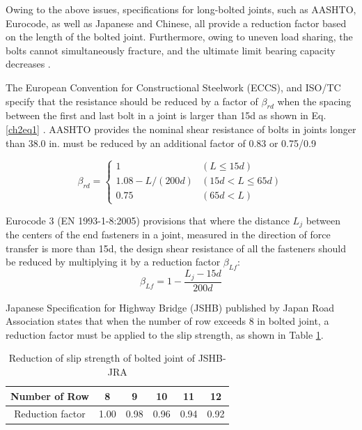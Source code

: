 Owing to the above issues, specifications for long-bolted joints, such as AASHTO, Eurocode, as well as Japanese and Chinese, all provide a reduction factor based on the length of the bolted joint\cite{AASHTO2020,eccs1985,isohtb,eurocode3-21,douji2017}. Furthermore, owing to uneven load sharing, the bolts cannot simultaneously fracture, and the ultimate limit bearing capacity decreases \cite{Takai2021BoltUnbuttoning,Peng2013FeaDimensions,peng2010,longstainless2022}. 

The European Convention for Constructional Steelwork (ECCS), and ISO/TC specify that the resistance should be reduced by a factor of $\beta_{rd}$ when the spacing between the first and last bolt in a joint is larger than 15d as shown in Eq.\ref{ch2eq1} \cite{eccs1985,isohtb}. AASHTO \cite{AASHTO2020} provides the nominal shear resistance of bolts in joints longer than 38.0 in. must be reduced by an additional factor of 0.83 or 0.75/0.9\par

\begin{equation}
    \beta_{rd} = \begin{cases}1 & (L \leq 15 d) \\ 1.08-L /(200 d) & (15 d<L \leq 65 d) \\ 0.75 & (65 d<L)\end{cases}
    \label{ch2eq1}
\end{equation}

Eurocode 3 (EN 1993-1-8:2005) \cite{eurocode3-21} provisions that where the distance $L_j$ between the centers of the end fasteners in a joint, measured in the direction of force transfer is more than 15d, the design shear resistance of all the fasteners should be reduced by multiplying it by a reduction factor $\beta_{Lf}$:
\begin{equation}
    \beta_{Lf}=1-\frac{L_j - 15d}{200d}
\end{equation}

Japanese Specification for Highway Bridge (JSHB) \cite{douji2017} published by Japan Road Association states that when the number of row exceeds 8 in bolted joint, a reduction factor must be applied to the slip strength, as shown in Table \ref{tab-jpredu}.
\begin{table}[h]
    \centering
    \caption{Reduction of slip strength of bolted joint of JSHB-JRA}
    \begin{tabular}{cccccc}
    \toprule
        Number of Row &  8 & 9 & 10 & 11 & 12 \\ \midrule
        Reduction factor & 1.00 & 0.98 & 0.96 & 0.94 & 0.92 \\ \bottomrule
    \end{tabular}
    \label{tab-jpredu}
\end{table}

